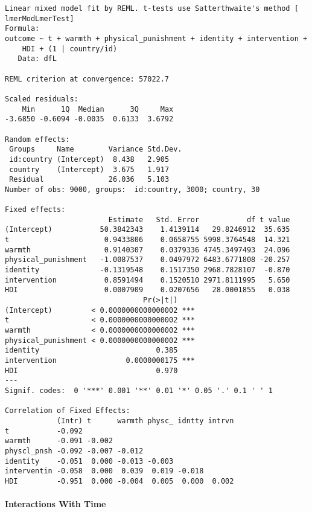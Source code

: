 \documentclass[
  letterpaper,
  DIV=11,
  numbers=noendperiod]{scrreprt}
\let\oldparagraph\paragraph
\renewcommand{\paragraph}[1]{\oldparagraph{#1}\mbox{}}
\begin{document}
\begin{verbatim}
Linear mixed model fit by REML. t-tests use Satterthwaite's method [
lmerModLmerTest]
Formula: 
outcome ~ t + warmth + physical_punishment + identity + intervention +  
    HDI + (1 | country/id)
   Data: dfL

REML criterion at convergence: 57022.7

Scaled residuals: 
    Min      1Q  Median      3Q     Max 
-3.6850 -0.6094 -0.0035  0.6133  3.6792 

Random effects:
 Groups     Name        Variance Std.Dev.
 id:country (Intercept)  8.438   2.905   
 country    (Intercept)  3.675   1.917   
 Residual               26.036   5.103   
Number of obs: 9000, groups:  id:country, 3000; country, 30

Fixed effects:
                        Estimate   Std. Error           df t value
(Intercept)           50.3842343    1.4139114   29.8246912  35.635
t                      0.9433806    0.0658755 5998.3764548  14.321
warmth                 0.9140307    0.0379336 4745.3497493  24.096
physical_punishment   -1.0087537    0.0497972 6483.6771808 -20.257
identity              -0.1319548    0.1517350 2968.7828107  -0.870
intervention           0.8591494    0.1520510 2971.8111995   5.650
HDI                    0.0007909    0.0207656   28.0001855   0.038
                                Pr(>|t|)    
(Intercept)         < 0.0000000000000002 ***
t                   < 0.0000000000000002 ***
warmth              < 0.0000000000000002 ***
physical_punishment < 0.0000000000000002 ***
identity                           0.385    
intervention                0.0000000175 ***
HDI                                0.970    
---
Signif. codes:  0 '***' 0.001 '**' 0.01 '*' 0.05 '.' 0.1 ' ' 1

Correlation of Fixed Effects:
            (Intr) t      warmth physc_ idntty intrvn
t           -0.092                                   
warmth      -0.091 -0.002                            
physcl_pnsh -0.092 -0.007 -0.012                     
identity    -0.051  0.000 -0.013 -0.003              
interventin -0.058  0.000  0.039  0.019 -0.018       
HDI         -0.951  0.000 -0.004  0.005  0.000  0.002
\end{verbatim}

\paragraph{Interactions With Time}\label{interactions-with-time-1}
\end{document}
